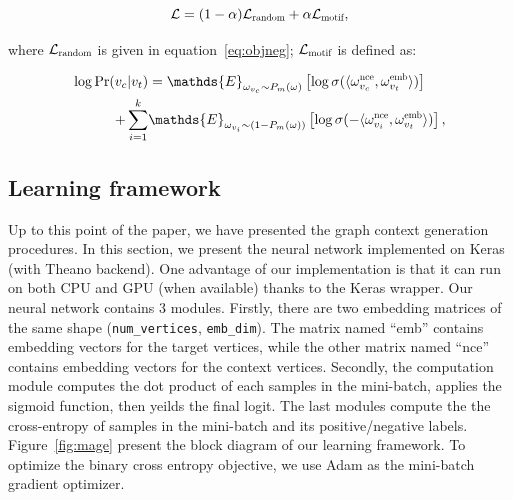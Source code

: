 \documentclass[letterpaper]{article}
\begin{document}
            \begin{equation}
                \label{eq:mageobj}
                \mathcal{L} = (1-\alpha) \mathcal{L}_{\scalebox{0.7}{random}} + 
                                \alpha \mathcal{L}_{\scalebox{0.7}{motif}} ,
            \end{equation}

            \noindent
            where $\mathcal{L}_{\scalebox{0.7}{random}}$ is given in equation~\ref{eq:objneg};
            $\mathcal{L}_{\scalebox{0.7}{motif}}$ is defined as:

            \begin{equation}
                \label{eq:objmotif}
                \begin{aligned}
                    \log \mbox{Pr} (v_c | v_t) & = \mathds{E}_{\omega_{v_c} \sim P_m(\omega)} \left[ \log \sigma( \langle \omega^{\scalebox{0.7}{nce}}_{v_c} , \omega^{\scalebox{0.7}{emb}}_{v_t} \rangle ) \right] \\
                + \sum_{i=1}^{k} & \mathds{E}_{\omega_{v_i} \sim (1-P_m(\omega))} \left[ \log \sigma( -\langle \omega^{\scalebox{0.7}{nce}}_{v_i} , \omega^{\scalebox{0.7}{emb}}_{v_t} \rangle) \right],
                \end{aligned}
            \end{equation}

        \subsection{Learning framework}
            
            Up to this point of the paper, we have presented the graph context generation procedures.
            In this section, we present the neural network implemented on Keras \cite{keras} 
            (with Theano \cite{theano} backend). One advantage of our implementation is that
            it can run on both CPU and GPU (when available) thanks to the Keras wrapper. Our
            neural network contains 3 modules. Firstly, there are two embedding matrices of 
            the same shape (\texttt{num\_vertices}, \texttt{emb\_dim}). The matrix named ``emb''
            contains embedding vectors for the target vertices, while the other matrix named
            ``nce'' contains embedding vectors for the context vertices. Secondly, the computation
            module computes the dot product of each samples in the mini-batch, applies the
            sigmoid function, then yeilds the final logit. The last modules compute the
            the cross-entropy \cite{xentropy} of samples in the mini-batch and its positive/negative
            labels. Figure~\ref{fig:mage} present the block diagram of our learning framework.
            To optimize the binary cross entropy objective, we use Adam \cite{adam} as the 
            mini-batch gradient optimizer.
            
\end{document}
